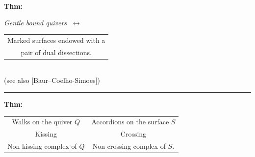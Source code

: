 \documentclass[portrait,final,a0paper,fontscale=0.25]{baposter}
\theoremstyle{definition}
\begin{document}
\begin{poster}
{{\color{red} \bf Thm:}
{\it Gentle bound quivers $\; \longleftrightarrow \;$ \begin{tabular}[t]{@{}c@{}} Marked surfaces endowed with a \\ pair of dual dissections.\end{tabular}} \\[-.35cm]
{\footnotesize (see also [Baur--Coelho-Simoes])}

\vspace{-.15cm}
\hspace{-.25cm}
{\color{red} \rule{10.02cm}{1pt}}
\vspace{-.35cm}

{\color{red} \bf Thm:} {\it
\hspace{-.55cm}
\begin{tabular}[t]{c@{$\quad \longleftrightarrow \quad$}c}
Walks on the quiver $Q$ & Accordions on the surface $S$ \\
Kissing & Crossing \\
Non-kissing complex of $Q$ & Non-crossing complex of $S$.
\end{tabular}
}

\vspace*{-.1cm}
}




\end{poster}
\end{document}
